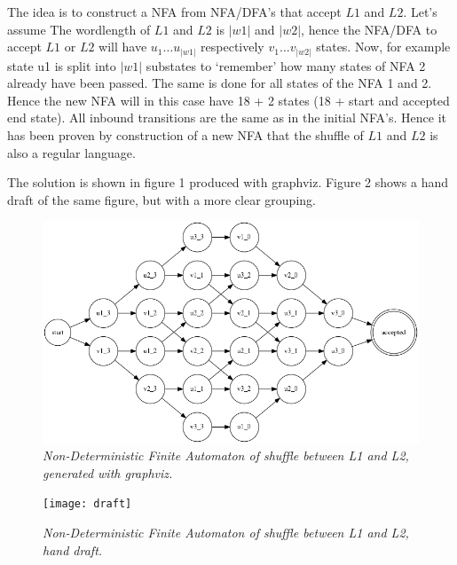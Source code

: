\documentclass[a4paper,11pt,twoside]{article}
\begin{document}
The idea is to construct a NFA from NFA/DFA's that accept $L1$ and $L2$. Let's assume The wordlength of $L1$ and $L2$ is $|w1|$ and $|w2|$, hence the NFA/DFA to accept $L1$ or $L2$ will have $u_{1} \ldots u_{|w1|}$ respectively $v_{1} \ldots v_{|w2|}$ states. Now, for example state u1 is split into $|w1|$ substates to `remember' how many states of NFA 2 already have been passed. The same is done for all states of the NFA 1 and 2. Hence the new NFA will in this case have 18 + 2 states (18 + start and accepted end state). All inbound transitions are the same as in the initial NFA's. Hence it has been proven by construction of a new NFA that the shuffle of $L1$ and $L2$ is also a regular language.

The solution is shown in figure 1 produced with graphviz. Figure 2 shows a hand draft of the same figure, but with a more clear grouping.

\begin{figure}
  \centering
  \includegraphics[width=\textwidth]{graph}
  \caption{\textit{Non-Deterministic Finite Automaton of shuffle between L1 and L2, generated with graphviz.}}
  \label{fig:graph}
\end{figure}

\begin{figure}
  \centering
  \texttt{[image: draft]}
  \caption{\textit{Non-Deterministic Finite Automaton of shuffle between L1 and L2, hand draft.}}
  \label{fig:graph}
\end{figure}

%
\end{document}
